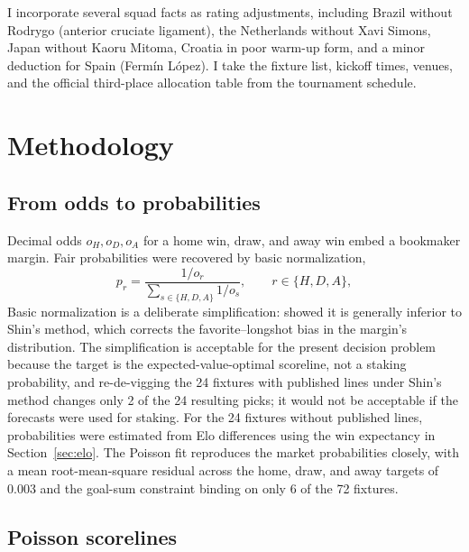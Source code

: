 \documentclass[11pt,letterpaper]{article}
\begin{document}
I incorporate several squad facts as rating adjustments, including Brazil without Rodrygo (anterior cruciate ligament), the Netherlands without Xavi Simons, Japan without Kaoru Mitoma, Croatia in poor warm-up form, and a minor deduction for Spain (Fermín López). I take the fixture list, kickoff times, venues, and the official third-place allocation table from the tournament schedule.

\section{Methodology}\label{sec:method}

\subsection{From odds to probabilities}

Decimal odds $o_H, o_D, o_A$ for a home win, draw, and away win embed a bookmaker margin. Fair probabilities were recovered by basic normalization,
\begin{equation}
p_r = \frac{1/o_r}{\sum_{s \in \{H,D,A\}} 1/o_s}, \qquad r \in \{H,D,A\},
\end{equation}
Basic normalization is a deliberate simplification: \citet{strumbelj2014} showed it is generally inferior to Shin's method, which corrects the favorite--longshot bias in the margin's distribution. The simplification is acceptable for the present decision problem because the target is the expected-value-optimal scoreline, not a staking probability, and re-de-vigging the 24 fixtures with published lines under Shin's method changes only 2 of the 24 resulting picks; it would not be acceptable if the forecasts were used for staking. For the 24 fixtures without published lines, probabilities were estimated from Elo differences using the win expectancy in Section~\ref{sec:elo}. The Poisson fit reproduces the market probabilities closely, with a mean root-mean-square residual across the home, draw, and away targets of 0.003 and the goal-sum constraint binding on only 6 of the 72 fixtures.

\subsection{Poisson scorelines}
\end{document}
